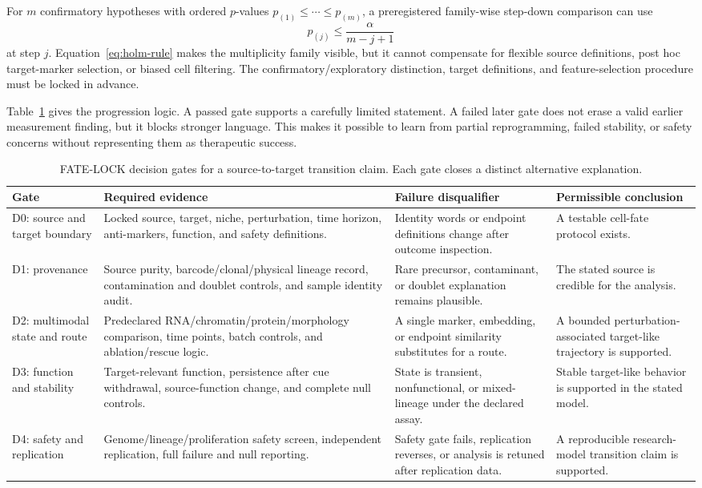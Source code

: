 \documentclass[10pt,conference]{IEEEtran}
\begin{document}
For $m$ confirmatory hypotheses with ordered $p$-values $p_{(1)}\leq\cdots\leq p_{(m)}$, a preregistered family-wise step-down comparison can use
\begin{equation}
p_{(j)}\leq\frac{\alpha}{m-j+1}
\label{eq:holm-rule}
\end{equation}
at step $j$. Equation~\eqref{eq:holm-rule} makes the multiplicity family visible, but it cannot compensate for flexible source definitions, post hoc target-marker selection, or biased cell filtering. The confirmatory/exploratory distinction, target definitions, and feature-selection procedure must be locked in advance.

Table~\ref{tab:decision-gates} gives the progression logic. A passed gate supports a carefully limited statement. A failed later gate does not erase a valid earlier measurement finding, but it blocks stronger language. This makes it possible to learn from partial reprogramming, failed stability, or safety concerns without representing them as therapeutic success.

\begin{table}[!t]
\caption{FATE-LOCK decision gates for a source-to-target transition claim. Each gate closes a distinct alternative explanation.}
\label{tab:decision-gates}
\centering
\footnotesize
\begin{tabular}{@{}p{}p{}p{}p{}@{}}
\toprule
Gate & Required evidence & Failure disqualifier & Permissible conclusion \\
\midrule
D0: source and target boundary & Locked source, target, niche, perturbation, time horizon, anti-markers, function, and safety definitions. & Identity words or endpoint definitions change after outcome inspection. & A testable cell-fate protocol exists. \\
D1: provenance & Source purity, barcode/clonal/physical lineage record, contamination and doublet controls, and sample identity audit. & Rare precursor, contaminant, or doublet explanation remains plausible. & The stated source is credible for the analysis. \\
D2: multimodal state and route & Predeclared RNA/chromatin/protein/morphology comparison, time points, batch controls, and ablation/rescue logic. & A single marker, embedding, or endpoint similarity substitutes for a route. & A bounded perturbation-associated target-like trajectory is supported. \\
D3: function and stability & Target-relevant function, persistence after cue withdrawal, source-function change, and complete null controls. & State is transient, nonfunctional, or mixed-lineage under the declared assay. & Stable target-like behavior is supported in the stated model. \\
D4: safety and replication & Genome/lineage/proliferation safety screen, independent replication, full failure and null reporting. & Safety gate fails, replication reverses, or analysis is retuned after replication data. & A reproducible research-model transition claim is supported. \\
\bottomrule
\end{tabular}
\end{table}
\end{document}
